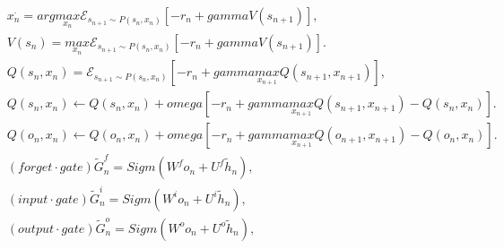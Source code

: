 \begin{align}
  & \mathbf{\mathit{x}}_{n}^{ \cdot } = arg \underset{\mathbf{\mathit{x}}_{n}}{max} \mathcal{E}_{\mathbf{\mathit{s}}_{n + 1} \sim \mathbf{\mathit{P}} \left(\mathbf{\mathit{s}}_{n} , \mathbf{\mathit{x}}_{n}\right)} \left[- r_{n} + \mathit{gamma} V \left(\mathbf{\mathit{s}}_{n + 1}\right)\right] , \tag{eq\_0080} \\
  & V \left(\mathbf{\mathit{s}}_{n}\right) = \underset{\mathbf{\mathit{x}}_{n}}{max} \mathcal{E}_{\mathbf{\mathit{s}}_{n + 1} \sim \mathbf{\mathit{P}} \left(\mathbf{\mathit{s}}_{n} , \mathbf{\mathit{x}}_{n}\right)} \left[- r_{n} + \mathit{gamma} V \left(\mathbf{\mathit{s}}_{n + 1}\right)\right] . \tag{eq\_0082} \\
  & Q \left(\mathbf{\mathit{s}}_{n} , \mathbf{\mathit{x}}_{n}\right) = \mathcal{E}_{\mathbf{\mathit{s}}_{n + 1} \sim \mathbf{\mathit{P}} \left(\mathbf{\mathit{s}}_{n} , \mathbf{\mathit{x}}_{n}\right)} \left[- r_{n} + \mathit{gamma} \underset{\mathbf{\mathit{x}}_{n + 1}}{max} Q \left(\mathbf{\mathit{s}}_{n + 1} , \mathbf{\mathit{x}}_{n + 1}\right)\right] , \tag{eq\_0084} \\
  & Q \left(\mathbf{\mathit{s}}_{n} , \mathbf{\mathit{x}}_{n}\right) \leftarrow Q \left(\mathbf{\mathit{s}}_{n} , \mathbf{\mathit{x}}_{n}\right) + \mathit{omega} \left[- r_{n} + \mathit{gamma} \underset{\mathbf{\mathit{x}}_{n + 1}}{max} Q \left(\mathbf{\mathit{s}}_{n + 1} , \mathbf{\mathit{x}}_{n + 1}\right) - Q \left(\mathbf{\mathit{s}}_{n} , \mathbf{\mathit{x}}_{n}\right)\right] . \tag{eq\_0086} \\
  & Q \left(\mathbf{\mathit{o}}_{n} , \mathbf{\mathit{x}}_{n}\right) \leftarrow Q \left(\mathbf{\mathit{o}}_{n} , \mathbf{\mathit{x}}_{n}\right) + \mathit{omega} \left[- r_{n} + \mathit{gamma} \underset{\mathbf{\mathit{x}}_{n + 1}}{max} Q \left(\mathbf{\mathit{o}}_{n + 1} , \mathbf{\mathit{x}}_{n + 1}\right) - Q \left(\mathbf{\mathit{o}}_{n} , \mathbf{\mathit{x}}_{n}\right)\right] . \tag{eq\_0088} \\
  & (forget \cdot gate) \overset{̃}{\mathbf{\mathit{G}}}_{n}^{f} = Sigm \left(\mathbf{\mathit{W}}^{f} \mathbf{\mathit{o}}_{n} + \mathbf{\mathit{U}}^{f} \overset{̃}{\mathbf{\mathit{h}}}_{n}\right) , \tag{eq\_0090} \\
  & (input \cdot gate) \overset{̃}{\mathbf{\mathit{G}}}_{n}^{i} = Sigm \left(\mathbf{\mathit{W}}^{i} \mathbf{\mathit{o}}_{n} + \mathbf{\mathit{U}}^{i} \overset{̃}{\mathbf{\mathit{h}}}_{n}\right) , \tag{eq\_0091} \\
  & (output \cdot gate) \overset{̃}{\mathbf{\mathit{G}}}_{n}^{o} = Sigm \left(\mathbf{\mathit{W}}^{o} \mathbf{\mathit{o}}_{n} + \mathbf{\mathit{U}}^{o} \overset{̃}{\mathbf{\mathit{h}}}_{n}\right) , \tag{eq\_0092} \\

\end{align}
